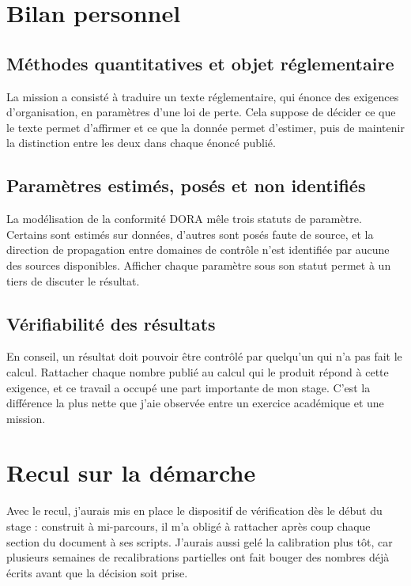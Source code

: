 \section*{Bilan personnel}
\label{ens:retiens}

\subsection*{Méthodes quantitatives et objet réglementaire}
La mission a consisté à traduire un texte réglementaire, qui énonce des exigences d'organisation, en
paramètres d'une loi de perte. Cela suppose de décider ce que le texte permet d'affirmer et ce que
la donnée permet d'estimer, puis de maintenir la distinction entre les deux dans chaque énoncé
publié.

\subsection*{Paramètres estimés, posés et non identifiés}
La modélisation de la conformité DORA mêle trois statuts de paramètre. Certains sont estimés sur
données, d'autres sont posés faute de source, et la direction de propagation entre domaines de
contrôle n'est identifiée par aucune des sources disponibles. Afficher chaque paramètre sous son
statut permet à un tiers de discuter le résultat.

\subsection*{Vérifiabilité des résultats}
En conseil, un résultat doit pouvoir être contrôlé par quelqu'un qui n'a pas fait le calcul.
Rattacher chaque nombre publié au calcul qui le produit répond à cette exigence, et ce travail a
occupé une part importante de mon stage. C'est la différence la plus nette que j'aie observée entre
un exercice académique et une mission.

\section*{Recul sur la démarche}
\label{ens:autrement}

Avec le recul, j'aurais mis en place le dispositif de vérification dès le début du stage : construit
à mi-parcours, il m'a obligé à rattacher après coup chaque section du document à ses scripts.
J'aurais aussi gelé la calibration plus tôt, car plusieurs semaines de recalibrations partielles ont
fait bouger des nombres déjà écrits avant que la décision soit prise.
